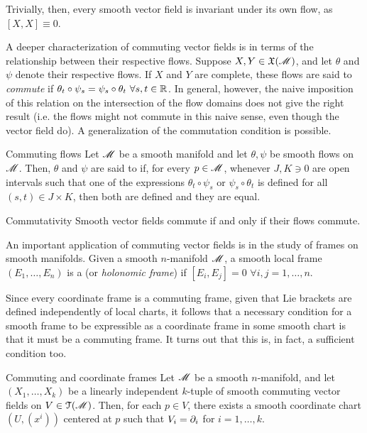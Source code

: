 Trivially, then, every smooth vector field is invariant under its own flow, as $ [X,X] \equiv 0 $.

A deeper characterization of commuting vector fields is in terms of the relationship between their respective flows. Suppose $ X,Y \in \mathfrak{X}(\mathscr{M}) $, and let $ \theta $ and $ \psi $ denote their respective flows. If $ X $ and $ Y $ are complete, these flows are said to \emph{commute} if $ \theta_t \circ \psi_s = \psi_s \circ \theta_t \,\,\forall s,t \in \mathbb{R} $. In general, however, the naive imposition of this relation on the intersection of the flow domains does not give the right result (i.e. the flows might not commute in this naive sense, even though the vector field do). A generalization of the commutation condition is possible.

\begin{definition}{Commuting flows}{}
  Let $ \mathscr{M} $ be a smooth manifold and let $ \theta , \psi $ be smooth flows on $ \mathscr{M} $. Then, $ \theta $ and $ \psi $ are said to  if, for every $ p \in \mathscr{M} $, whenever $ J , K \ni 0 $ are open intervals such that one of the expressions $ \theta_t \circ \psi_s $ or $ \psi_s \circ \theta_t $ is defined for all $ (s,t) \in J \times K $, then both are defined and they are equal.
\end{definition}

\begin{theorem}{Commutativity}{}
  Smooth vector fields commute if and only if their flows commute.
\end{theorem}

An important application of commuting vector fields is in the study of frames on smooth manifolds. Given a smooth $ n $-manifold $ \mathscr{M} $, a smooth local frame $ (E_1 , \dots , E_n) $ is a  (or \emph{holonomic frame}) if $ [E_i , E_j] = 0 \,\,\forall i,j = 1 , \dots , n $.

Since every coordinate frame is a commuting frame, given that Lie brackets are defined independently of local charts, it follows that a necessary condition for a smooth frame to be expressible as a coordinate frame in some smooth chart is that it must be a commuting frame. It turns out that this is, in fact, a sufficient condition too.

\begin{proposition}{Commuting and coordinate frames}{}
  Let $ \mathscr{M} $ be a smooth $ n $-manifold, and let $ (X_1 , \dots , X_k) $ be a linearly independent $ k $-tuple of smooth commuting vector fields on $ V \in \EuScript{T}(\mathscr{M}) $. Then, for each $ p \in V $, there exists a smooth coordinate chart $ (U , (x^i)) $ centered at $ p $ such that $ V_i = \partial_i $ for $ i = 1 , \dots , k $.
\end{proposition}

